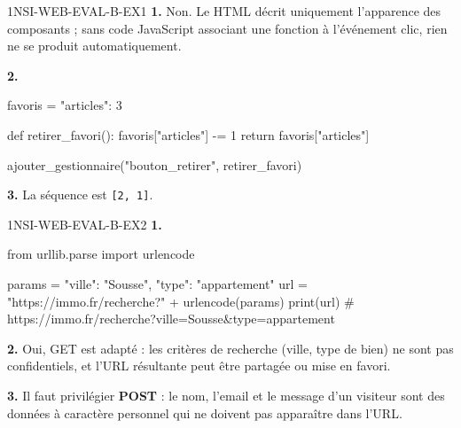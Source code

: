 \begin{corrige}{1NSI-WEB-EVAL-B-EX1}
\textbf{1.} Non. Le HTML décrit uniquement l'apparence des composants ; sans code
JavaScript associant une fonction à l'événement clic, rien ne se produit automatiquement.

\textbf{2.}
\begin{python}
favoris = {"articles": 3}

def retirer_favori():
    favoris["articles"] -= 1
    return favoris["articles"]

ajouter_gestionnaire("bouton_retirer", retirer_favori)
\end{python}

\textbf{3.} La séquence est \lstinline{[2, 1]}.
\end{corrige}

\begin{corrige}{1NSI-WEB-EVAL-B-EX2}
\textbf{1.}
\begin{python}
from urllib.parse import urlencode

params = {"ville": "Sousse", "type": "appartement"}
url = "https://immo.fr/recherche?" + urlencode(params)
print(url)
# https://immo.fr/recherche?ville=Sousse&type=appartement
\end{python}

\textbf{2.} Oui, GET est adapté : les critères de recherche (ville, type de bien) ne sont
pas confidentiels, et l'URL résultante peut être partagée ou mise en favori.

\textbf{3.} Il faut privilégier \textbf{POST} : le nom, l'email et le message d'un
visiteur sont des données à caractère personnel qui ne doivent pas apparaître dans l'URL.
\end{corrige}
